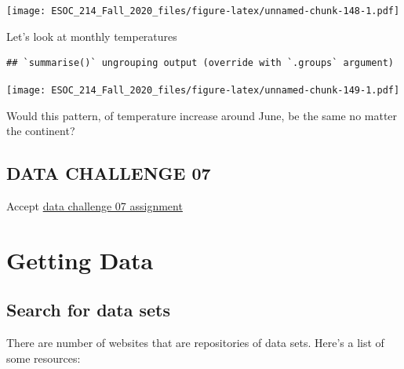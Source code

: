\documentclass[
]{book}
\newenvironment{Shaded}{\begin{snugshade}}{\end{snugshade}}
\newcommand{\DataTypeTok}[1]{\textcolor[rgb]{0.13,0.29,0.53}{#1}}
\newcommand{\KeywordTok}[1]{\textcolor[rgb]{0.13,0.29,0.53}{\textbf{#1}}}
\newcommand{\NormalTok}[1]{#1}
\newcommand{\OperatorTok}[1]{\textcolor[rgb]{0.81,0.36,0.00}{\textbf{#1}}}
\newcommand{\OtherTok}[1]{\textcolor[rgb]{0.56,0.35,0.01}{#1}}
\newcommand{\StringTok}[1]{\textcolor[rgb]{0.31,0.60,0.02}{#1}}
\begin{document}
\texttt{[image: ESOC\_214\_Fall\_2020\_files/figure-latex/unnamed-chunk-148-1.pdf]}

Let's look at monthly temperatures

\begin{Shaded}
\end{Shaded}

\begin{verbatim}
## `summarise()` ungrouping output (override with `.groups` argument)
\end{verbatim}

\texttt{[image: ESOC\_214\_Fall\_2020\_files/figure-latex/unnamed-chunk-149-1.pdf]}

Would this pattern, of temperature increase around June, be the same no matter the continent?

\hypertarget{data-challenge-07}{%
\section{DATA CHALLENGE 07}\label{data-challenge-07}}

Accept \href{}{data challenge 07 assignment}

\hypertarget{getting-data}{%
\chapter{Getting Data}\label{getting-data}}

\hypertarget{search-for-data-sets}{%
\section{Search for data sets}\label{search-for-data-sets}}

There are number of websites that are repositories of data sets. Here's a list of some resources:
\end{document}
